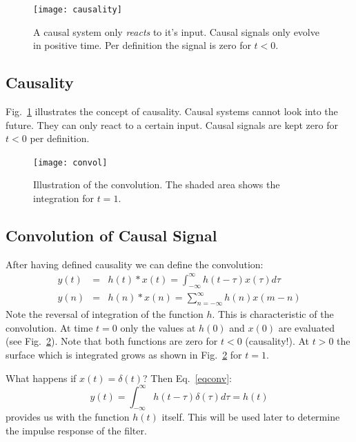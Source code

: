 \documentclass[12pt,a4paper]{article}
\begin{document}
\begin{figure}[!hbt]
\begin{center}
\mbox{\texttt{[image: causality]}}
\end{center}
\caption{A causal system only \textsl{reacts} to it's input.
Causal signals only evolve in positive time. Per definition the
signal is zero for $t<0$.
\label{causality}}
\end{figure}


\subsection{Causality}
Fig.~\ref{causality} illustrates the concept of causality.
Causal systems cannot look into the future. They can only react
to a certain input. Causal signals are kept zero for $t<0$
per definition.

\begin{figure}[!hbt]
\begin{center}
\mbox{\texttt{[image: convol]}}
\end{center}
\caption{Illustration of the convolution. The shaded area
shows the integration for $t=1$.
\label{convolution}}
\end{figure}




\subsection{Convolution of Causal Signal}
After having defined causality we can define the convolution:
\begin{eqnarray} 
  y(t) & = & h(t) * x(t) = \int_{-\infty}^{\infty} h(t - \tau) x(\tau) d\tau \\
  y(n) & = & h(n) * x(n) = \sum_{n = -\infty}^\infty h(n) x(m - n)
\label{eqconv}
\end{eqnarray}
Note the reversal of integration of the function $h$. This
is characteristic of the convolution. At time $t=0$
only the values at $h(0)$ and $x(0)$ are evaluated 
(see Fig.~\ref{convolution}). Note
that both functions are zero for $t<0$ (causality!).
At $t>0$ the surface which is integrated grows as shown
in Fig.~\ref{convolution} for $t=1$.

What happens if $x(t)=\delta(t)$? Then Eq.~\ref{eqconv}:
\begin{equation} 
y(t) = \int_{-\infty}^{\infty} h(t - \tau) \delta(\tau) d\tau = h(t)
\label{convdelta}
\end{equation}
provides us with the function $h(t)$ itself. This will
be used later to determine the impulse response of the
filter.
\end{document}
